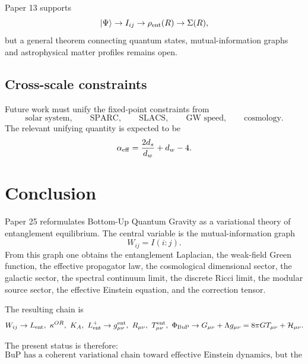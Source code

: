 \documentclass[11pt,a4paper]{article}
\begin{document}
Paper 13 supports
\begin{equation}
  |\Psi\rangle
  \to
  I_{ij}
  \to
  \rho_{\rm ent}(R)
  \to
  \Sigma(R),
\end{equation}
but a general theorem connecting quantum states, mutual-information graphs and
astrophysical matter profiles remains open.

\subsection{Cross-scale constraints}

Future work must unify the fixed-point constraints from
\begin{equation}
  \text{solar system},\qquad
  \text{SPARC},\qquad
  \text{SLACS},\qquad
  \text{GW speed},\qquad
  \text{cosmology}.
\end{equation}
The relevant unifying quantity is expected to be
\begin{equation}
  \alpha_{\rm eff}
  =
  \frac{2d_s}{d_w}
  +
  d_w
  -
  4.
\end{equation}

\section{Conclusion}

Paper 25 reformulates Bottom-Up Quantum Gravity as a variational theory of
entanglement equilibrium. The central variable is the mutual-information graph
\begin{equation}
  W_{ij}=I(i:j).
\end{equation}
From this graph one obtains the entanglement Laplacian, the weak-field Green
function, the effective propagator law, the cosmological dimensional sector,
the galactic sector, the spectral continuum limit, the discrete Ricci limit,
the modular source sector, the effective Einstein equation, and the correction
tensor.

The resulting chain is
\begin{equation}
  W_{ij}
  \to
  L_{\rm ent},\ \kappa^{OR},\ K_A,\ L_{\rm ent}^{+}
  \to
  g_{\mu\nu}^{\rm ent},\ R_{\mu\nu},\ T_{\mu\nu}^{\rm ent},\ \Phi_{\rm BuP}
  \to
  G_{\mu\nu}
  +
  \Lambda g_{\mu\nu}
  =
  8\pi G T_{\mu\nu}
  +
  \mathcal H_{\mu\nu}.
\end{equation}

The present status is therefore:
\begin{equation}
  \boxed{
  \text{BuP has a coherent variational chain toward effective Einstein
  dynamics, but the complete analytical theorem remains open.}
  }
\end{equation}
\end{document}
